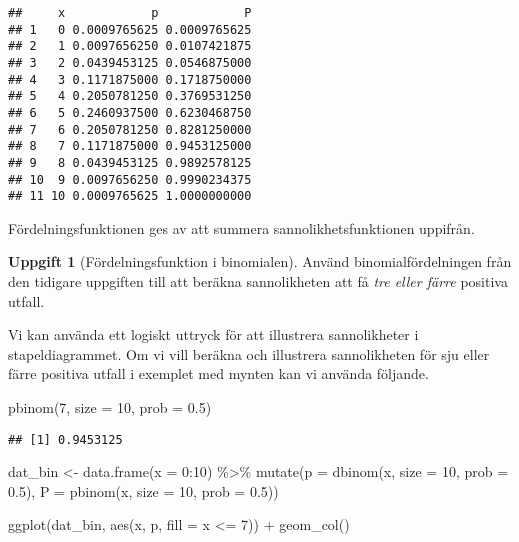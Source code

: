 \documentclass[
]{book}
\newenvironment{Shaded}{\begin{snugshade}}{\end{snugshade}}
\newcommand{\AttributeTok}[1]{\textcolor[rgb]{0.77,0.63,0.00}{#1}}
\newcommand{\DecValTok}[1]{\textcolor[rgb]{0.00,0.00,0.81}{#1}}
\newcommand{\FloatTok}[1]{\textcolor[rgb]{0.00,0.00,0.81}{#1}}
\newcommand{\FunctionTok}[1]{\textcolor[rgb]{0.00,0.00,0.00}{#1}}
\newcommand{\NormalTok}[1]{#1}
\newcommand{\OtherTok}[1]{\textcolor[rgb]{0.56,0.35,0.01}{#1}}
\newcommand{\SpecialCharTok}[1]{\textcolor[rgb]{0.00,0.00,0.00}{#1}}
\theoremstyle{definition}
\theoremstyle{definition}
\theoremstyle{definition}
\newtheorem{exercise}{Uppgift}[chapter]
\theoremstyle{definition}
\theoremstyle{remark}
\begin{document}
\begin{verbatim}
##     x            p            P
## 1   0 0.0009765625 0.0009765625
## 2   1 0.0097656250 0.0107421875
## 3   2 0.0439453125 0.0546875000
## 4   3 0.1171875000 0.1718750000
## 5   4 0.2050781250 0.3769531250
## 6   5 0.2460937500 0.6230468750
## 7   6 0.2050781250 0.8281250000
## 8   7 0.1171875000 0.9453125000
## 9   8 0.0439453125 0.9892578125
## 10  9 0.0097656250 0.9990234375
## 11 10 0.0009765625 1.0000000000
\end{verbatim}

Fördelningsfunktionen ges av att summera sannolikhetsfunktionen uppifrån.

\begin{exercise}[Fördelningsfunktion i binomialen]
Använd binomialfördelningen från den tidigare uppgiften till att beräkna sannolikheten att få \emph{tre eller färre} positiva utfall.
\end{exercise}

Vi kan använda ett logiskt uttryck för att illustrera sannolikheter i stapeldiagrammet. Om vi vill beräkna och illustrera sannolikheten för sju eller färre positiva utfall i exemplet med mynten kan vi använda följande.

\begin{Shaded}
\begin{Highlighting}[]
\FunctionTok{pbinom}\NormalTok{(}\DecValTok{7}\NormalTok{, }\AttributeTok{size =} \DecValTok{10}\NormalTok{, }\AttributeTok{prob =} \FloatTok{0.5}\NormalTok{)}
\end{Highlighting}
\end{Shaded}

\begin{verbatim}
## [1] 0.9453125
\end{verbatim}

\begin{Shaded}
\begin{Highlighting}[]
\NormalTok{dat\_bin }\OtherTok{\textless{}{-}} \FunctionTok{data.frame}\NormalTok{(}\AttributeTok{x =} \DecValTok{0}\SpecialCharTok{:}\DecValTok{10}\NormalTok{) }\SpecialCharTok{\%\textgreater{}\%} 
  \FunctionTok{mutate}\NormalTok{(}\AttributeTok{p =} \FunctionTok{dbinom}\NormalTok{(x, }\AttributeTok{size =} \DecValTok{10}\NormalTok{, }\AttributeTok{prob =} \FloatTok{0.5}\NormalTok{),}
         \AttributeTok{P =} \FunctionTok{pbinom}\NormalTok{(x, }\AttributeTok{size =} \DecValTok{10}\NormalTok{, }\AttributeTok{prob =} \FloatTok{0.5}\NormalTok{))}

\FunctionTok{ggplot}\NormalTok{(dat\_bin, }\FunctionTok{aes}\NormalTok{(x, p, }\AttributeTok{fill =}\NormalTok{ x }\SpecialCharTok{\textless{}=} \DecValTok{7}\NormalTok{)) }\SpecialCharTok{+}
  \FunctionTok{geom\_col}\NormalTok{()}
\end{Highlighting}
\end{Shaded}
\end{document}
